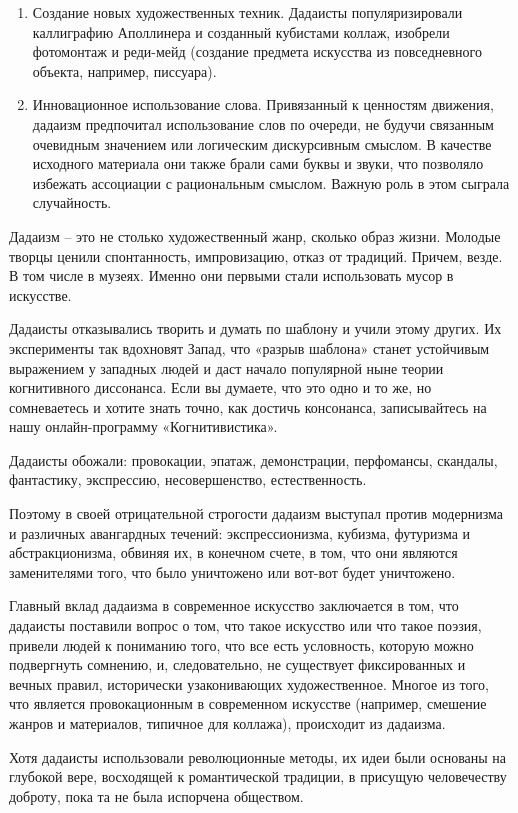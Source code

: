 \begin{enumerate}
    \item Создание новых художественных техник. Дадаисты популяризировали каллиграфию Аполлинера и созданный кубистами коллаж, изобрели фотомонтаж и реди-мейд (создание предмета искусства из повседневного объекта, например, писсуара).
    \item Инновационное использование слова. Привязанный к ценностям движения, дадаизм предпочитал использование слов по очереди, не будучи связанным очевидным значением или логическим дискурсивным смыслом. В качестве исходного материала они также брали сами буквы и звуки, что позволяло избежать ассоциации с рациональным смыслом. Важную роль в этом сыграла случайность.
\end{enumerate}
Дадаизм – это не столько художественный жанр, сколько образ жизни. Молодые творцы ценили спонтанность, импровизацию, отказ от традиций. Причем, везде. В том числе в музеях. Именно они первыми стали использовать мусор в искусстве.

Дадаисты отказывались творить и думать по шаблону и учили этому других. Их эксперименты так вдохновят Запад, что «разрыв шаблона» станет устойчивым выражением у западных людей и даст начало популярной ныне теории когнитивного диссонанса. Если вы думаете, что это одно и то же, но сомневаетесь и хотите знать точно, как достичь консонанса, записывайтесь на нашу онлайн-программу «Когнитивистика».

Дадаисты обожали:
провокации,
эпатаж,
демонстрации,
перфомансы,
скандалы,
фантастику,
экспрессию,
несовершенство,
естественность.

Поэтому в своей отрицательной строгости дадаизм выступал против модернизма и различных авангардных течений: экспрессионизма, кубизма, футуризма и абстракционизма, обвиняя их, в конечном счете, в том, что они являются заменителями того, что было уничтожено или вот-вот будет уничтожено.

Главный вклад дадаизма в современное искусство заключается в том, что дадаисты поставили вопрос о том, что такое искусство или что такое поэзия, привели людей к пониманию того, что все есть условность, которую можно подвергнуть сомнению, и, следовательно, не существует фиксированных и вечных правил, исторически узаконивающих художественное. Многое из того, что является провокационным в современном искусстве (например, смешение жанров и материалов, типичное для коллажа), происходит из дадаизма.

Хотя дадаисты использовали революционные методы, их идеи были основаны на глубокой вере, восходящей к романтической традиции, в присущую человечеству доброту, пока та не была испорчена обществом.

